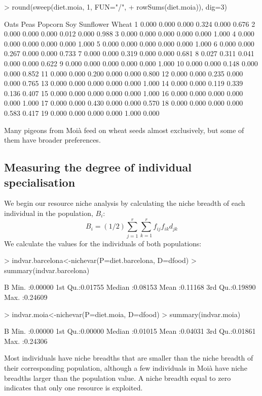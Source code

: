 \documentclass[11pt,a4paper]{article}
\begin{document}
\begin{Schunk}
\begin{Sinput}
> round(sweep(diet.moia, 1, FUN="/", 
+             rowSums(diet.moia)), dig=3)
\end{Sinput}
\begin{Soutput}
    Oats  Peas Popcorn   Soy Sunflower Wheat
1  0.000 0.000   0.000 0.324     0.000 0.676
2  0.000 0.000   0.000 0.012     0.000 0.988
3  0.000 0.000   0.000 0.000     0.000 1.000
4  0.000 0.000   0.000 0.000     0.000 1.000
5  0.000 0.000   0.000 0.000     0.000 1.000
6  0.000 0.000   0.267 0.000     0.000 0.733
7  0.000 0.000   0.319 0.000     0.000 0.681
8  0.027 0.311   0.041 0.000     0.000 0.622
9  0.000 0.000   0.000 0.000     0.000 1.000
10 0.000 0.000   0.148 0.000     0.000 0.852
11 0.000 0.000   0.200 0.000     0.000 0.800
12 0.000 0.000   0.235 0.000     0.000 0.765
13 0.000 0.000   0.000 0.000     0.000 1.000
14 0.000 0.000   0.119 0.339     0.136 0.407
15 0.000 0.000   0.000 0.000     0.000 1.000
16 0.000 0.000   0.000 0.000     0.000 1.000
17 0.000 0.000   0.430 0.000     0.000 0.570
18 0.000 0.000   0.000 0.000     0.583 0.417
19 0.000 0.000   0.000 0.000     1.000 0.000
\end{Soutput}
\end{Schunk}
Many pigeons from Moià feed on wheat seeds almost exclusively, but some of them have broader preferences. 

\subsection{Measuring the degree of individual specialisation}
We begin our resource niche analysis by calculating the niche breadth of each individual in the population, $B_i$:
\[
B_i = (1/2)\sum_{j=1}^r\sum_{k=1}^r{f_{ij}f_{ik}d_{jk}}
\]
We calculate the values for the individuals of both populations:
\begin{Schunk}
\begin{Sinput}
> indvar.barcelona<-nichevar(P=diet.barcelona, D=dfood)
> summary(indvar.barcelona)
\end{Sinput}
\begin{Soutput}
       B          
 Min.   :0.00000  
 1st Qu.:0.01755  
 Median :0.08153  
 Mean   :0.11168  
 3rd Qu.:0.19890  
 Max.   :0.24609  
\end{Soutput}
\begin{Sinput}
> indvar.moia<-nichevar(P=diet.moia, D=dfood)
> summary(indvar.moia)
\end{Sinput}
\begin{Soutput}
       B          
 Min.   :0.00000  
 1st Qu.:0.00000  
 Median :0.01015  
 Mean   :0.04031  
 3rd Qu.:0.01861  
 Max.   :0.24306  
\end{Soutput}
\end{Schunk}
Most individuals have niche breadths that are smaller than the niche breadth of their corresponding population, although a few individuals in Moià have niche breadths larger than the population value. A niche breadth equal to zero indicates that only one resource is exploited. 
\end{document}
